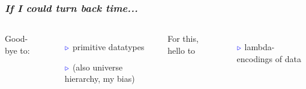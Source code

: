 \documentclass[11pt]{beamer}
\newcommand{\myb}[0]{\ensuremath{\textcolor{blue}{\triangleright}}}
\begin{document}
\begin{frame}
  \frametitle{\emph{If I could turn back time...}}

  \begin{columns}
\hspace{.5cm}    \column{2.8in}

  Good-bye to:

  \begin{itemize}
  \item[$\myb$] primitive datatypes
  \item[$\myb$] (also universe hierarchy, my bias)
  \end{itemize}

\vspace{.2cm}

  For this, hello to

  \begin{itemize}
  \item[$\myb$] lambda-encodings of data
  \end{itemize}

  \column{2.6in}
  \end{columns}

  \end{frame}
\end{document}
